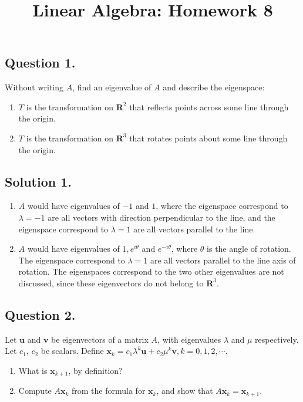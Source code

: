 \documentclass{article}
\title{Linear Algebra: Homework 8}
\begin{document}
\maketitle
\subsection*{Question 1.}
Without writing $A$, find an eigenvalue of $A$ and describe the eigenspace:
\begin{enumerate} [label=(\arabic*)]
    \item $T$ is the transformation on $\mathbf{R}^2$ that reflects points across some line through the origin.
    \item $T$ is the transformation on $\mathbf{R}^3$ that rotates points about some line through the origin. 
\end{enumerate}
\subsection*{Solution 1.}
\begin{enumerate} [label=(\arabic*)]
    \item $A$ would have eigenvalues of $-1$ and $1$, where the eigenspace correspond to $\lambda=-1$ are all vectors with direction perpendicular to the line, and the eigenspace correspond to $\lambda=1$ are all vectors parallel to the line.
    \item $A$ would have eigenvalues of $1,e^{i\theta}$ and $e^{-i\theta}$, where $\theta$ is the angle of rotation. The eigenspace correspond to $\lambda=1$ are all vectors parallel to the line axis of rotation. The eigenspaces correspond to the two other eigenvalues are not discussed, since these eigenvectors do not belong to $\mathbf{R}^3$.
\end{enumerate}
\subsection*{Question 2.}
Let $\mathbf{u}$ and $\mathbf{v}$ be eigenvectors of a matrix $A$, with eigenvalues $\lambda$ and $\mu$ respectively. Let $c_1$, $c_2$ be scalars. Define $\mathbf{x}_k=c_1\lambda^k\mathbf{u}+c_2\mu^k\mathbf{v},k=0,1,2,\cdots.$
\begin{enumerate} [label=(\arabic*)]
    \item What is $\mathbf{x}_{k+1}$, by definition?
    \item Compute $A\mathbf{x}_k$ from the formula for $\mathbf{x}_k$, and show that $A\mathbf{x}_k=\mathbf{x}_{k+1}$.
\end{enumerate}
\end{document}
